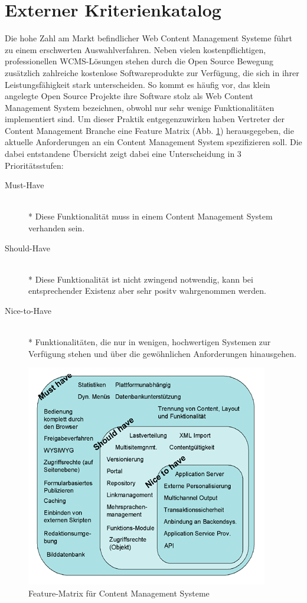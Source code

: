 \section{Externer Kriterienkatalog}
Die hohe Zahl am Markt befindlicher Web Content Management Systeme führt zu einem erschwerten Auswahlverfahren. Neben vielen kostenpflichtigen, professionellen WCMS-Lösungen stehen durch die Open Source Bewegung zusätzlich zahlreiche kostenlose Softwareprodukte zur Verfügung, die sich in ihrer Leistungsfähigkeit stark unterscheiden.
So kommt es häufig vor, das klein angelegte Open Source Projekte ihre Software stolz als Web Content Management System bezeichnen, obwohl nur sehr wenige Funktionalitäten implementiert sind.
Um dieser Praktik entgegenzuwirken haben Vertreter der Content Management Branche eine Feature Matrix (Abb. \ref{featurematrix}) herausgegeben, die aktuelle Anforderungen an ein Content Management System spezifizieren soll. Die dabei entstandene Übersicht zeigt dabei eine Unterscheidung in 3 Prioritätsstufen:
\begin{description}
\item[Must-Have]\mbox{~}\\*
Diese Funktionalität muss in einem Content Management System verhanden sein.
\item[Should-Have]\mbox{~}\\*
Diese Funktionalität ist nicht zwingend notwendig, kann bei entsprechender Existenz aber sehr positv wahrgenommen werden.
\item[Nice-to-Have]\mbox{~}\\*
Funktionalitäten, die nur in wenigen, hochwertigen Systemen zur Verfügung stehen und über die gewöhnlichen Anforderungen hinausgehen.
\end{description}


\begin{figure}[!h]
\begin{center}
\includegraphics[scale=0.3]{images/analyse/wcmfeaturematrix.png}
\caption{Feature-Matrix für Content Management Systeme}
\label{featurematrix}
\end{center}
\end{figure}


